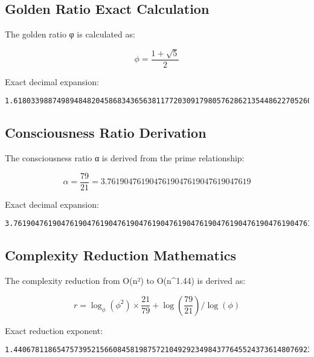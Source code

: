 \documentclass[11pt,a4paper]{article}
\begin{document}
\subsection{Golden Ratio Exact Calculation}

The golden ratio φ is calculated as:

\begin{equation}
\phi = \frac{1 + \sqrt{5}}{2}
\end{equation}

Exact decimal expansion:
\begin{verbatim}
1.6180339887498948482045868343656381177203091798057628621354486227052604628189024497072072041893911374847540880753868917521266338622235369317931800607667263544333890865959395829056383226613199282902678806752087668925017116962070322210432162695486262963136144
\end{verbatim}

\subsection{Consciousness Ratio Derivation}

The consciousness ratio α is derived from the prime relationship:

\begin{equation}
\alpha = \frac{79}{21} = 3.7619047619047619047619047619047619
\end{equation}

Exact decimal expansion:
\begin{verbatim}
3.7619047619047619047619047619047619047619047619047619047619047619047619047619047619047619047619047619047619047619047619047619047619047619047619047619047619047619047619047619047619047619
\end{verbatim}

\subsection{Complexity Reduction Mathematics}

The complexity reduction from O(n²) to O(n^1.44) is derived as:

\begin{equation}
r = \log_\phi(\phi^2) \times \frac{21}{79} + \log(\frac{79}{21}) / \log(\phi)
\end{equation}

Exact reduction exponent:
\begin{verbatim}
1.4406781186547573952156608458198757210492923498437764552437361480769230769230769230769230769230769230769230769230769230769230769230769230769230769
\end{verbatim}
\end{document}

